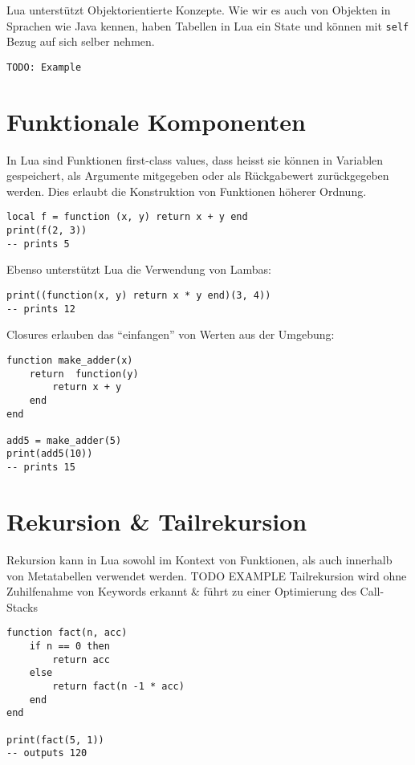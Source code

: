 \documentclass[11pt,a4paper]{article}
\begin{document}
Lua unterstützt Objektorientierte Konzepte. Wie wir es auch von Objekten in Sprachen wie Java kennen, haben Tabellen in Lua ein State und können mit \texttt{self} Bezug auf sich selber nehmen.

\begin{verbatim}
TODO: Example
\end{verbatim}

\section*{Funktionale Komponenten}

In Lua sind Funktionen first-class values, dass heisst sie können in Variablen gespeichert, als Argumente mitgegeben oder als Rückgabewert zurückgegeben werden. Dies erlaubt die Konstruktion von Funktionen höherer Ordnung.

\begin{lstlisting}
local f = function (x, y) return x + y end
print(f(2, 3))
-- prints 5
\end{lstlisting}

Ebenso unterstützt Lua die Verwendung von Lambas:

\begin{lstlisting}
print((function(x, y) return x * y end)(3, 4))
-- prints 12
\end{lstlisting}

Closures erlauben das “einfangen” von Werten aus der Umgebung:

\begin{lstlisting}
function make_adder(x)
	return  function(y)
		return x + y
	end
end

add5 = make_adder(5)
print(add5(10))
-- prints 15
\end{lstlisting}

\section*{Rekursion \& Tailrekursion}

Rekursion kann in Lua sowohl im Kontext von Funktionen, als auch innerhalb von Metatabellen verwendet werden. TODO EXAMPLE
Tailrekursion wird ohne Zuhilfenahme von Keywords erkannt \& führt zu einer Optimierung des Call-Stacks

\begin{lstlisting}
function fact(n, acc)
	if n == 0 then
		return acc
	else
		return fact(n -1 * acc)
	end
end

print(fact(5, 1))
-- outputs 120
\end{lstlisting}
\end{document}

